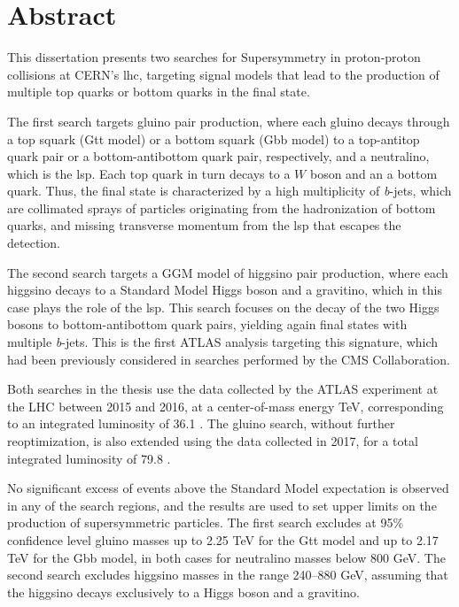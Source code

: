 \chapter*{Abstract}

This dissertation presents two searches for Supersymmetry in proton-proton collisions at CERN's \gls{lhc}, 
targeting signal models that lead to the production of multiple top quarks or bottom quarks in the final state.

The first search targets gluino pair production, where each gluino decays through a top squark (Gtt model) or a bottom squark (Gbb model) 
to a top-antitop quark pair or a bottom-antibottom quark pair, respectively, and a neutralino, which is the \gls{lsp}. 
Each top quark in turn decays to a $W$ boson and an a bottom quark.
Thus, the final state is characterized by a high multiplicity of \textit{b}-jets, which are collimated sprays of particles originating from the hadronization of bottom quarks, and 
missing transverse momentum from the \gls{lsp} that escapes the detection. 

The second search targets a GGM model of higgsino pair production, 
where each higgsino decays to a Standard Model Higgs boson and 
a gravitino, which in this case plays the role of the \gls{lsp}. 
This search focuses on the decay of the two Higgs bosons to bottom-antibottom quark pairs, yielding again final states with multiple \textit{b}-jets.
This is the first ATLAS analysis targeting this signature, which had been 
previously considered in searches performed by the CMS Collaboration.

Both searches in the thesis use the data collected by the ATLAS experiment at the LHC 
between 2015 and 2016, at a center-of-mass energy  \cmtre TeV,
corresponding to an integrated luminosity of 36.1 \ifb.
The gluino search, without further reoptimization, is also extended using the data collected in 2017, for a total integrated luminosity of 79.8 \ifb.

No significant excess of events above the Standard Model expectation is observed in any of the search regions, 
and the results are used to set upper limits on the production of supersymmetric particles. 
The first search excludes at 95\% confidence level gluino masses up to 2.25 TeV for the Gtt model 
and up to 2.17 TeV for the Gbb model, in both cases for neutralino masses below 800 GeV.
The second search excludes higgsino masses in the range 240--880 GeV, assuming 
that the higgsino decays exclusively to a Higgs boson and a gravitino. 

\par\bigskip
\par\bigskip 
\par\bigskip

